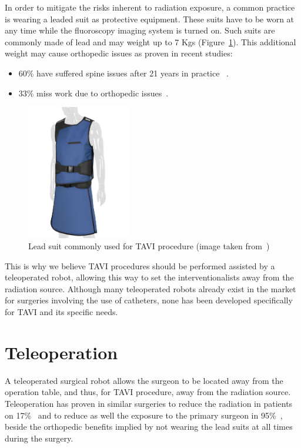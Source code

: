 In order to mitigate the risks inherent to radiation exposure, a common practice is wearing a leaded suit as protective equipment. These suits have to be worn at any time while the fluoroscopy imaging system is turned on. Such suits are commonly made of lead and may weight up to 7 Kgs (Figure~\ref{img:leadvest}). This additional weight may cause orthopedic issues as proven in recent studies:
\begin{itemize}
 \item  60\% have suffered spine issues after 21 years in practice ~\cite{tavihazards}.
 \item 	33\% miss work due to orthopedic issues~\cite{tavimissed}.\\
\end{itemize}

\begin{figure}[ht]
   \centering
   \includegraphics[width=0.4\textwidth]{img/leadvest.PNG}
   \caption{Lead suit commonly used for TAVI procedure (image taken from~\protect\cite{tavivest})}
   \label{img:leadvest}
\end{figure}

This is why we believe TAVI procedures should be performed assisted by a teleoperated robot, allowing this way to set the interventionalists away from the radiation source. Although many teleoperated robots already exist in the market for surgeries involving the use of catheters, none has been developed specifically for TAVI and its specific needs.\\
\clearpage

\section{Teleoperation}\label{sec:teleoperation}

A teleoperated surgical robot allows the surgeon to be located away from the operation table, and thus, for TAVI procedure, away from the radiation source. Teleoperation has proven in similar surgeries to reduce the radiation in patients on 17\%~\cite{pci} and to reduce as well the exposure to the primary surgeon in 95\%~\cite{pcisafety}, beside the orthopedic benefits implied by not wearing the lead suits at all times during the surgery.\\

